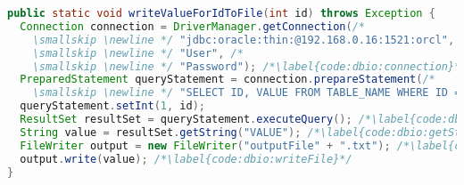 
\begin{lstlisting}[language=Java, caption={Example of code with both database reading and file writing operations}, label={code:dbio}]
public static void writeValueForIdToFile(int id) throws Exception {
  Connection connection = DriverManager.getConnection(/*
    \smallskip \newline */ "jdbc:oracle:thin:@192.168.0.16:1521:orcl", /*
    \smallskip \newline */ "User", /*
    \smallskip \newline */ "Password"); /*\label{code:dbio:connection}*/
  PreparedStatement queryStatement = connection.prepareStatement(/*
    \smallskip \newline */ "SELECT ID, VALUE FROM TABLE_NAME WHERE ID = ?"); /*\label{code:dbio:statement:begin}*/
  queryStatement.setInt(1, id);
  ResultSet resultSet = queryStatement.executeQuery(); /*\label{code:dbio:execute}*/
  String value = resultSet.getString("VALUE"); /*\label{code:dbio:getString}*/
  FileWriter output = new FileWriter("outputFile" + ".txt"); /*\label{code:dbio:outputFile}*/
  output.write(value); /*\label{code:dbio:writeFile}*/
}
\end{lstlisting}

